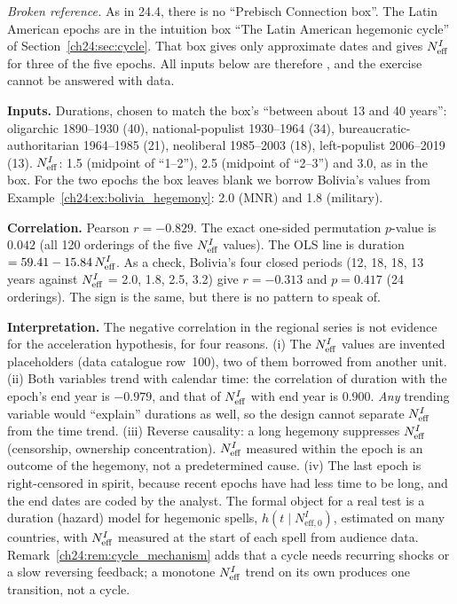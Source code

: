 \documentclass[../solutions_manual.tex]{subfiles}
\begin{document}

\emph{Broken reference.} As in 24.4, there is no ``Prebisch Connection box''. The Latin American epochs are in the intuition box ``The Latin American hegemonic cycle'' of Section~\ref{ch24:sec:cycle}. That box gives only approximate dates and gives $N_{\text{eff}}^I$ for three of the five epochs. All inputs below are therefore \illustrative, and the exercise cannot be answered with data.

 \textbf{Inputs.} Durations, chosen to match the box's ``between about 13 and 40 years'': oligarchic 1890--1930 (40), national-populist 1930--1964 (34), bureaucratic-authoritarian 1964--1985 (21), neoliberal 1985--2003 (18), left-populist 2006--2019 (13). $N_{\text{eff}}^I$: 1.5 (midpoint of ``1--2''), 2.5 (midpoint of ``2--3'') and 3.0, as in the box. For the two epochs the box leaves blank we borrow Bolivia's values from Example~\ref{ch24:ex:bolivia_hegemony}: 2.0 (MNR) and 1.8 (military).

 \textbf{Correlation.} Pearson $r = -0.829$. The exact one-sided permutation $p$-value is $0.042$ (all 120 orderings of the five $N_{\text{eff}}^I$ values). The OLS line is duration $= 59.41 - 15.84\,N_{\text{eff}}^I$. As a check, Bolivia's four closed periods (12, 18, 18, 13 years against $N_{\text{eff}}^I$ = 2.0, 1.8, 2.5, 3.2) give $r = -0.313$ and $p = 0.417$ (24 orderings). The sign is the same, but there is no pattern to speak of.

 \textbf{Interpretation.} The negative correlation in the regional series is not evidence for the acceleration hypothesis, for four reasons. (i) The $N_{\text{eff}}^I$ values are invented placeholders (data catalogue row~100), two of them borrowed from another unit. (ii) Both variables trend with calendar time: the correlation of duration with the epoch's end year is $-0.979$, and that of $N_{\text{eff}}^I$ with end year is $0.900$. \emph{Any} trending variable would ``explain'' durations as well, so the design cannot separate $N_{\text{eff}}^I$ from the time trend. (iii) Reverse causality: a long hegemony suppresses $N_{\text{eff}}^I$ (censorship, ownership concentration). $N_{\text{eff}}^I$ measured within the epoch is an outcome of the hegemony, not a predetermined cause. (iv) The last epoch is right-censored in spirit, because recent epochs have had less time to be long, and the end dates are coded by the analyst. The formal object for a real test is a duration (hazard) model for hegemonic spells, $h(t \mid N^I_{\text{eff},0})$, estimated on many countries, with $N_{\text{eff}}^I$ measured at the start of each spell from audience data. Remark~\ref{ch24:rem:cycle_mechanism} adds that a cycle needs recurring shocks or a slow reversing feedback; a monotone $N_{\text{eff}}^I$ trend on its own produces one transition, not a cycle.
\end{document}
